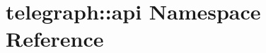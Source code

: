 \hypertarget{namespacetelegraph_1_1api}{}\section{telegraph\+:\+:api Namespace Reference}
\label{namespacetelegraph_1_1api}
